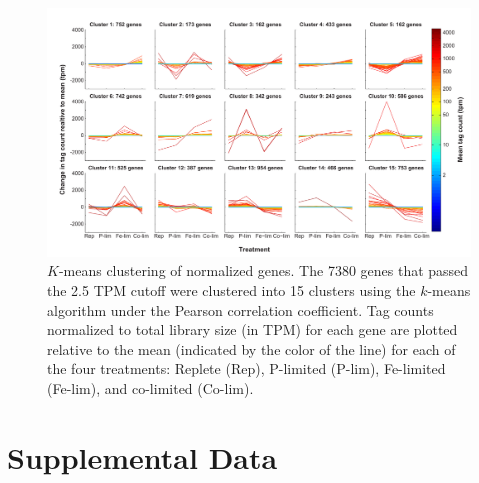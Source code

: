 \begin{landscape}
   \null         %
   \vfill        %
   \centering 
    \begin{figure}
    \centering
        \includegraphics[width=1\textwidth]{Images/C2_FigureS2_v6.pdf}
        \caption[$K$-means clustering of normalized genes]{$K$-means clustering of normalized genes. The 7380 genes that passed the 2.5 TPM cutoff were clustered into 15 clusters using the $k$-means algorithm under the Pearson correlation coefficient. Tag counts normalized to total library size (in TPM) for each gene are plotted relative to the mean (indicated by the color of the line) for each of the four treatments: Replete (Rep), P-limited (P-lim), Fe-limited (Fe-lim), and co-limited (Co-lim).}
  \label{fig:a1f2}

    \end{figure}
    \vfill        %
\end{landscape}

\clearpage
\section{Supplemental Data}


